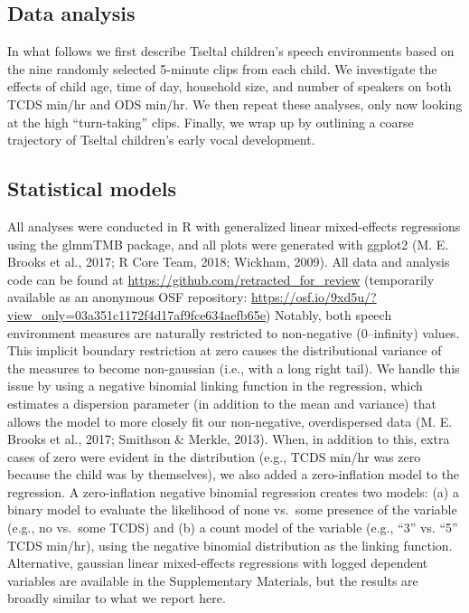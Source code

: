 \documentclass[floatsintext,man]{apa6}
\theoremstyle{definition}
\theoremstyle{definition}
\theoremstyle{definition}
\theoremstyle{remark}
\begin{document}
\subsection{Data analysis}\label{methods-analysisinfo}

In what follows we first describe Tseltal children's speech environments
based on the nine randomly selected 5-minute clips from each child. We
investigate the effects of child age, time of day, household size, and
number of speakers on both TCDS min/hr and ODS min/hr. We then repeat
these analyses, only now looking at the high \enquote{turn-taking}
clips. Finally, we wrap up by outlining a coarse trajectory of Tseltal
children's early vocal development.

\subsection{Statistical models}\label{statistical-models}

All analyses were conducted in R with generalized linear mixed-effects
regressions using the glmmTMB package, and all plots were generated with
ggplot2 (M. E. Brooks et al., 2017; R Core Team, 2018; Wickham, 2009).
All data and analysis code can be found at
\url{https://github.com/retracted_for_review} (temporarily available as
an anonymous OSF repository:
\url{https://osf.io/9xd5u/?view_only=03a351c1172f4d17af9fce634aefb65e})
Notably, both speech environment measures are naturally restricted to
non-negative (0--infinity) values. This implicit boundary restriction at
zero causes the distributional variance of the measures to become
non-gaussian (i.e., with a long right tail). We handle this issue by
using a negative binomial linking function in the regression, which
estimates a dispersion parameter (in addition to the mean and variance)
that allows the model to more closely fit our non-negative,
overdispersed data (M. E. Brooks et al., 2017; Smithson \& Merkle,
2013). When, in addition to this, extra cases of zero were evident in
the distribution (e.g., TCDS min/hr was zero because the child was by
themselves), we also added a zero-inflation model to the regression. A
zero-inflation negative binomial regression creates two models: (a) a
binary model to evaluate the likelihood of none vs.~some presence of the
variable (e.g., no vs.~some TCDS) and (b) a count model of the variable
(e.g., \enquote{3} vs. \enquote{5} TCDS min/hr), using the negative
binomial distribution as the linking function. Alternative, gaussian
linear mixed-effects regressions with logged dependent variables are
available in the Supplementary Materials, but the results are broadly
similar to what we report here.
\end{document}
